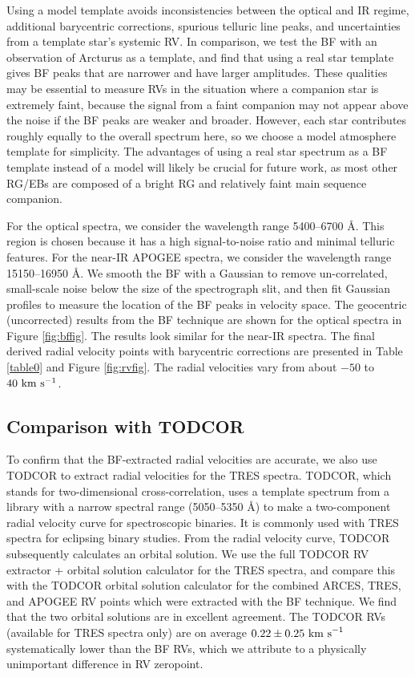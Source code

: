 Using a model template avoids inconsistencies between the optical and IR regime, additional barycentric corrections, spurious telluric line peaks, and uncertainties from a template star's systemic RV. In comparison, we test the BF with an observation of Arcturus as a template, and find that using a real star template gives BF peaks that are narrower and have larger amplitudes. These qualities may be essential to measure RVs in the situation where a companion star is extremely faint, because the signal from a faint companion may not appear above the noise if the BF peaks are weaker and broader. However, each star contributes roughly equally to the overall spectrum here, so we choose a model atmosphere template for simplicity. The advantages of using a real star spectrum as a BF template instead of a model will likely be crucial for future work, as most other RG/EBs are composed of a bright RG and relatively faint main sequence companion.

For the optical spectra, we consider the wavelength range 5400--6700 \AA. This region is chosen because it has a high signal-to-noise ratio and minimal telluric features. For the near-IR APOGEE spectra, we consider the wavelength range 15150--16950 \AA. We smooth the BF with a Gaussian to remove un-correlated, small-scale noise below the size of the spectrograph slit, and then fit Gaussian profiles to measure the location of the BF peaks in velocity space. The geocentric (uncorrected) results from the BF technique are shown for the optical spectra in Figure \ref{fig:bffig}. The results look similar for the near-IR spectra. The final derived radial velocity points with barycentric corrections are presented in Table \ref{table0} and Figure \ref{fig:rvfig}. The radial velocities vary from about $-50$ to $40 \ \rm{km} \ \rm{s}^{-1}$.

\subsection{Comparison with TODCOR}\label{todcor}
To confirm that the BF-extracted radial velocities are accurate, we also use TODCOR \citep{zuc94} to extract radial velocities for the TRES spectra. TODCOR, which stands for two-dimensional cross-correlation, uses a template spectrum from a library with a narrow spectral range (5050--5350 \AA) to make a two-component radial velocity curve for spectroscopic binaries. It is commonly used with TRES spectra for eclipsing binary studies. From the radial velocity curve, TODCOR subsequently calculates an orbital solution. We use the full TODCOR RV extractor + orbital solution calculator for the TRES spectra, and compare this with the TODCOR orbital solution calculator for the combined ARCES, TRES, and APOGEE RV points which were extracted with the BF technique. We find that the two orbital solutions are in excellent agreement. The TODCOR RVs (available for TRES spectra only) are on average $0.22 \pm 0.25 \ \rm{km \ s}^{-1}$ systematically lower than the BF RVs, which we attribute to a physically unimportant difference in RV zeropoint.
 
  
  
  
  
  
  
  
  
  
  
  
  